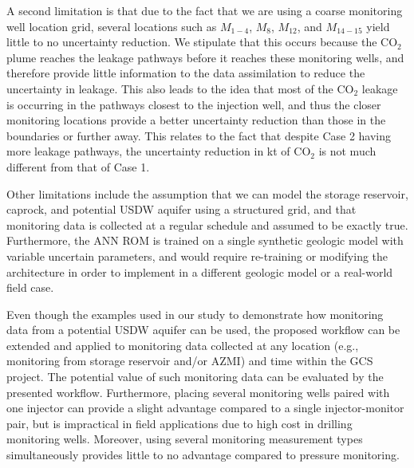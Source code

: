 \documentclass[a4paper,fleqn]{cas-sc}
\begin{document}
A second limitation is that due to the fact that we are using a coarse monitoring well location grid, several locations such as $M_{1-4}$, $M_8$, $M_{12}$, and $M_{14-15}$ yield little to no uncertainty reduction. We stipulate that this occurs because the CO$_2$ plume reaches the leakage pathways before it reaches these monitoring wells, and therefore provide little information to the data assimilation to reduce the uncertainty in leakage. This also leads to the idea that most of the CO$_2$ leakage is occurring in the pathways closest to the injection well, and thus the closer monitoring locations provide a better uncertainty reduction than those in the boundaries or further away. This relates to the fact that despite Case 2 having more leakage pathways, the uncertainty reduction in kt of CO$_2$ is not much different from that of Case 1.

Other limitations include the assumption that we can model the storage reservoir, caprock, and potential USDW aquifer using a structured grid, and that monitoring data is collected at a regular schedule and assumed to be exactly true. Furthermore, the ANN ROM is trained on a single synthetic geologic model with variable uncertain parameters, and would require re-training or modifying the architecture in order to implement in a different geologic model or a real-world field case. 

Even though the examples used in our study to demonstrate how monitoring data from a potential USDW aquifer can be used, the proposed workflow can be extended and applied to monitoring data collected at any location (e.g., monitoring from storage reservoir and/or AZMI) and time within the GCS project. The potential value of such monitoring data can be evaluated by the presented workflow. Furthermore, placing several monitoring wells paired with one injector can provide a slight advantage compared to a single injector-monitor pair, but is impractical in field applications due to high cost in drilling monitoring wells. Moreover, using several monitoring measurement types simultaneously provides little to no advantage compared to pressure monitoring. 

\end{document}
